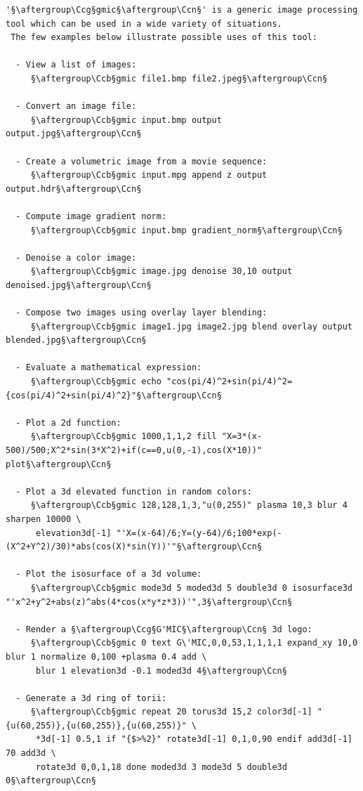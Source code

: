 \documentclass[a4paper,10.5pt,twoside]{book}
\def\Ccb{\color{cb}}
\def\Ccg{\color{cc}}
\def\Ccn{\color{black}}
\begin{document}
\begin{lstlisting}[escapechar=§]
 '§\aftergroup\Ccg§gmic§\aftergroup\Ccn§' is a generic image processing tool which can be used in a wide variety of situations. 
 The few examples below illustrate possible uses of this tool: 
 
  - View a list of images: 
     §\aftergroup\Ccb§gmic file1.bmp file2.jpeg§\aftergroup\Ccn§ 
 
  - Convert an image file: 
     §\aftergroup\Ccb§gmic input.bmp output output.jpg§\aftergroup\Ccn§ 
 
  - Create a volumetric image from a movie sequence: 
     §\aftergroup\Ccb§gmic input.mpg append z output output.hdr§\aftergroup\Ccn§ 
 
  - Compute image gradient norm: 
     §\aftergroup\Ccb§gmic input.bmp gradient_norm§\aftergroup\Ccn§ 
 
  - Denoise a color image: 
     §\aftergroup\Ccb§gmic image.jpg denoise 30,10 output denoised.jpg§\aftergroup\Ccn§ 
 
  - Compose two images using overlay layer blending: 
     §\aftergroup\Ccb§gmic image1.jpg image2.jpg blend overlay output blended.jpg§\aftergroup\Ccn§ 
 
  - Evaluate a mathematical expression: 
     §\aftergroup\Ccb§gmic echo "cos(pi/4)^2+sin(pi/4)^2={cos(pi/4)^2+sin(pi/4)^2}"§\aftergroup\Ccn§ 
 
  - Plot a 2d function: 
     §\aftergroup\Ccb§gmic 1000,1,1,2 fill "X=3*(x-500)/500;X^2*sin(3*X^2)+if(c==0,u(0,-1),cos(X*10))" plot§\aftergroup\Ccn§ 
 
  - Plot a 3d elevated function in random colors: 
     §\aftergroup\Ccb§gmic 128,128,1,3,"u(0,255)" plasma 10,3 blur 4 sharpen 10000 \
      elevation3d[-1] "'X=(x-64)/6;Y=(y-64)/6;100*exp(-(X^2+Y^2)/30)*abs(cos(X)*sin(Y))'"§\aftergroup\Ccn§ 
 
  - Plot the isosurface of a 3d volume: 
     §\aftergroup\Ccb§gmic mode3d 5 moded3d 5 double3d 0 isosurface3d "'x^2+y^2+abs(z)^abs(4*cos(x*y*z*3))'",3§\aftergroup\Ccn§ 
 
  - Render a §\aftergroup\Ccg§G'MIC§\aftergroup\Ccn§ 3d logo: 
     §\aftergroup\Ccb§gmic 0 text G\'MIC,0,0,53,1,1,1,1 expand_xy 10,0 blur 1 normalize 0,100 +plasma 0.4 add \
      blur 1 elevation3d -0.1 moded3d 4§\aftergroup\Ccn§ 
 
  - Generate a 3d ring of torii: 
     §\aftergroup\Ccb§gmic repeat 20 torus3d 15,2 color3d[-1] "{u(60,255)},{u(60,255)},{u(60,255)}" \
      *3d[-1] 0.5,1 if "{$>%2}" rotate3d[-1] 0,1,0,90 endif add3d[-1] 70 add3d \
      rotate3d 0,0,1,18 done moded3d 3 mode3d 5 double3d 0§\aftergroup\Ccn§ 
 

\end{lstlisting}
\end{document}
